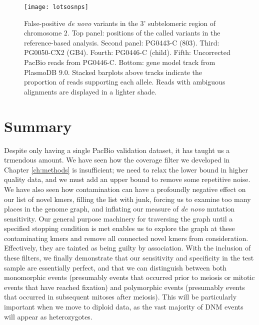 \begin{sidewaysfigure}[h!]
  \centering
    \texttt{[image: lotsosnps]}
  \caption{False-positive \textit{de novo} variants in the 3' subtelomeric region of chromosome $2$.  Top panel: positions of the called variants in the reference-based analysis.  Second panel: PG0443-C (803).  Third: PG0050-CX2 (GB4).  Fourth: PG0446-C (child).  Fifth: Uncorrected PacBio reads from PG0446-C.  Bottom: gene model track from PlasmoDB $9.0$.  Stacked barplots above tracks indicate the proportion of reads supporting each allele.  Reads with ambiguous alignments are displayed in a lighter shade.}
  \label{fig:lotsosnps}
\end{sidewaysfigure}

\section{Summary}

Despite only having a single PacBio validation dataset, it has taught us a trmendous amount.  We have seen how the coverage filter we developed in Chapter \ref{ch:methods} is insufficient; we need to relax the lower bound in higher quality data, and we must add an upper bound to remove some repetitive noise.  We have also seen how contamination can have a profoundly negative effect on our list of novel kmers, filling the list with junk, forcing us to examine too many places in the genome graph, and inflating our measure of \textit{de novo} mutation sensitivity.  Our general purpose machinery for traversing the graph until a specified stopping condition is met enables us to explore the graph at these contaminating kmers and remove all connected novel kmers from consideration.  Effectively, they are tainted as being guilty by association.  With the inclusion of these filters, we finally demonstrate that our sensitivity and specificity in the test sample are essentially perfect, and that we can distinguish between both monomorphic events (presumably events that occurred prior to meiosis or mitotic events that have reached fixation) and polymorphic events (presumably events that occurred in subsequent mitoses after meiosis).  This will be particularly important when we move to diploid data, as the vast majority of DNM events will appear as heterozygotes.
